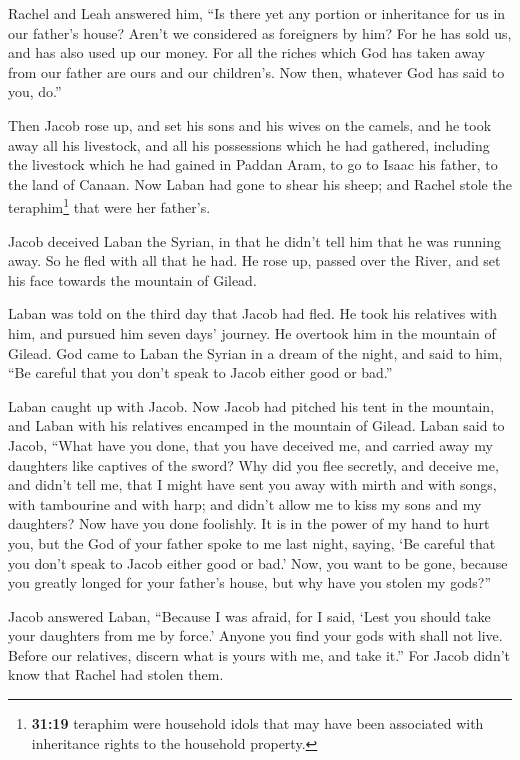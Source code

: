  Rachel and Leah answered him, ``Is there yet any portion
or inheritance for us in our father's house?  Aren't we
considered as foreigners by him? For he has sold us, and has also used
up our money.  For all the riches which God has taken
away from our father are ours and our children's. Now then, whatever God
has said to you, do.''

 Then Jacob rose up, and set his sons and his wives on
the camels,  and he took away all his livestock, and all
his possessions which he had gathered, including the livestock which he
had gained in Paddan Aram, to go to Isaac his father, to the land of
Canaan.  Now Laban had gone to shear his sheep; and
Rachel stole the teraphim\footnote{\textbf{31:19} teraphim were
  household idols that may have been associated with inheritance rights
  to the household property.} that were her father's.

 Jacob deceived Laban the Syrian, in that he didn't tell
him that he was running away.  So he fled with all that
he had. He rose up, passed over the River, and set his face towards the
mountain of Gilead.

 Laban was told on the third day that Jacob had fled.
 He took his relatives with him, and pursued him seven
days' journey. He overtook him in the mountain of Gilead.
 God came to Laban the Syrian in a dream of the night,
and said to him, ``Be careful that you don't speak to Jacob either good
or bad.''

 Laban caught up with Jacob. Now Jacob had pitched his
tent in the mountain, and Laban with his relatives encamped in the
mountain of Gilead.  Laban said to Jacob, ``What have you
done, that you have deceived me, and carried away my daughters like
captives of the sword?  Why did you flee secretly, and
deceive me, and didn't tell me, that I might have sent you away with
mirth and with songs, with tambourine and with harp;  and
didn't allow me to kiss my sons and my daughters? Now have you done
foolishly.  It is in the power of my hand to hurt you,
but the God of your father spoke to me last night, saying, `Be careful
that you don't speak to Jacob either good or bad.'  Now,
you want to be gone, because you greatly longed for your father's house,
but why have you stolen my gods?''

 Jacob answered Laban, ``Because I was afraid, for I
said, `Lest you should take your daughters from me by force.'
 Anyone you find your gods with shall not live. Before
our relatives, discern what is yours with me, and take it.'' For Jacob
didn't know that Rachel had stolen them.

